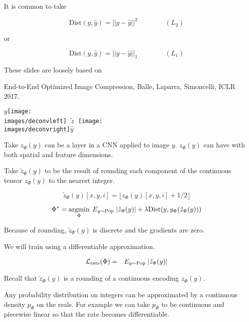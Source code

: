 {\vfill
It is common to take

$$\mathrm{Dist}(y,\hat{y}) = ||y-\hat{y}||^2 \hspace{4em}(L_2)$$

\vfill
or

$$\mathrm{Dist}(y,\hat{y}) = ||y-\hat{y}||_1 \hspace{4em} (L_1)$$


These slides are loosely based on

\vfill
End-to-End Optimized Image Compression, Balle, Laparra, Simoncelli, ICLR 2017.


\vfill
\centerline{$y$\texttt{[image: \\images/deconvleft]} $\;\tilde{z}\;$ \texttt{[image: \\images/deconvright]}$\hat{y}$}



Take $z_\Phi(y)$ can be a layer in a CNN applied to image $y$.  $z_\Phi(y)$ can have with both spatial and feature dimensions.

\vfill
Take $\tilde{z}_\Phi(y)$ to be the result of rounding each component of the continuous tensor $z_\Phi(y)$ to the nearest integer.

\vfill
$$\tilde{z}_\Phi(y)[x,y,i] = \lfloor z_\Phi(y)[x,y,i] + 1/2 \rfloor$$


$$\Phi^* = \operatorname*{argmin}_\Phi \;E_{y \sim \mathrm{Pop}}\;|\tilde{z}_\Phi(y)| + \lambda \mathrm{Dist}(y,y_\Phi(\tilde{z}_\Phi(y)))$$

\vfill
Because of rounding, $\tilde{z}_\Phi(y)$ is discrete and the gradients are zero.

\vfill
We will train using a differentiable approximation.


\begin{eqnarray*}
{\cal L}_{\mathrm{rate}}(\Phi) & = & E_{y \sim \mathrm{Pop}}\;|\tilde{z}_\Phi(y)|
\end{eqnarray*}

\vfill
Recall that {\color{red} $\tilde{z}_\Phi(y)$} is a rounding of a continuous encoding {\color{red} $z_\Phi(y)$}.

\vfill
Any probability distribution on integers can be approximated by a continuous density $p_\Phi$ on the reals.  For example we can take $p_\Phi$ to be continuous and
piecewise linear so that the rate becomes differentiable.

}
